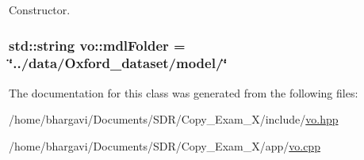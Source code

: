Constructor. 

\subsubsection[{\texorpdfstring{mdl\+Folder}{mdlFolder}}]{\setlength{\rightskip}{0pt plus 5cm}std\+::string vo\+::mdl\+Folder = \char`\"{}../data/Oxford\+\_\+dataset/model/\char`\"{}}\hypertarget{classvo_a6cec8c62c2984586bece5102f2d55d02}{}\label{classvo_a6cec8c62c2984586bece5102f2d55d02}


The documentation for this class was generated from the following files\+:\begin{DoxyCompactItemize}
\item 
/home/bhargavi/\+Documents/\+S\+D\+R/\+Copy\+\_\+\+Exam\+\_\+X/include/\hyperlink{vo_8hpp}{vo.\+hpp}\item 
/home/bhargavi/\+Documents/\+S\+D\+R/\+Copy\+\_\+\+Exam\+\_\+X/app/\hyperlink{vo_8cpp}{vo.\+cpp}\end{DoxyCompactItemize}
